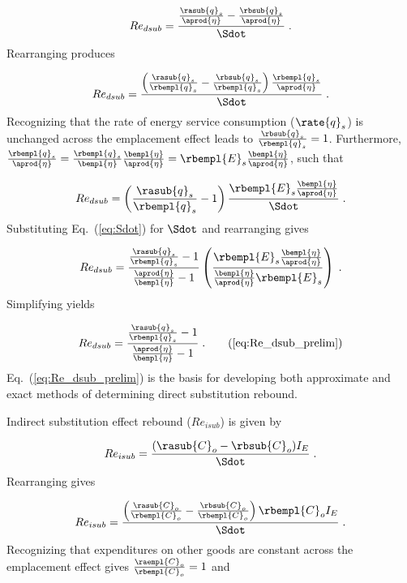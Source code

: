 \begin{equation}
  Re_{dsub} = \frac{\frac{\rasub{q}_s}{\aprod{\eta}} - \frac{\rbsub{q}_s}{\aprod{\eta}}}{\Sdot} \; .
\end{equation}
%
Rearranging produces

\begin{equation}
  Re_{dsub} = \frac{ \left( \frac{\rasub{q}_s}{\rbempl{q}_s}
                    - \frac{\rbsub{q}_s}{\rbempl{q}_s}  \right) \frac{\rbempl{q}_s}{\aprod{\eta}} }{\Sdot} \; .
\end{equation}
%
Recognizing that the rate of energy service consumption ($\rate{q}_s$)
is unchanged across the emplacement effect leads to $\frac{\rbsub{q}_s}{\rbempl{q}_s} = 1$.
Furthermore, $\frac{\rbempl{q}_s}{\aprod{\eta}}
            = \frac{\rbempl{q}_s}{\bempl{\eta}} \frac{\bempl{\eta}}{\aprod{\eta}}
            = \rbempl{E}_s \frac{\bempl{\eta}}{\aprod{\eta}}$,
such that

\begin{equation}
  Re_{dsub} = \left( \frac{\rasub{q}_s}{\rbempl{q}_s} - 1  \right)
              \frac{\rbempl{E}_s \frac{\bempl{\eta}}{\aprod{\eta}}}{\Sdot} \; .
\end{equation}
%
Substituting Eq.~(\ref{eq:Sdot}) for $\Sdot$ and rearranging gives

\begin{equation}
  Re_{dsub} = \frac{\frac{\rasub{q}_s}{\rbempl{q}_s} - 1}{\frac{\aprod{\eta}}{\bempl{\eta}} - 1}
              \left( \frac{\rbempl{E}_s \frac{\bempl{\eta}}{\aprod{\eta}}}{\frac{\bempl{\eta}}{\aprod{\eta}} \rbempl{E}_s} \right) \; .
\end{equation}
%
Simplifying yields

\begin{equation}
  Re_{dsub} = \frac{\frac{\rasub{q}_s}{\rbempl{q}_s} - 1}{\frac{\aprod{\eta}}{\bempl{\eta}} - 1} \; .
                                                               \tag{\ref{eq:Re_dsub_prelim}}
\end{equation}
%
Eq.~(\ref{eq:Re_dsub_prelim}) is the basis for
developing both approximate and exact methods of determining
direct substitution rebound.

Indirect substitution effect rebound ($Re_{isub}$) is given by

\begin{equation}
  Re_{isub} = \frac{(\rasub{C}_o - \rbsub{C}_{o}) I_E}{\Sdot} \; .
\end{equation}
%
Rearranging gives

\begin{equation}
  Re_{isub} = \frac{\left(\frac{\rasub{C}_o}{\rbempl{C}_o} - \frac{\rbsub{C}_o}{\rbempl{C}_o}  \right) \rbempl{C}_o I_E }{\Sdot} \; .
\end{equation}
%
Recognizing that expenditures on other goods are constant across the emplacement effect gives
$\frac{\raempl{C}_o}{\rbempl{C}_o} = 1$ and

